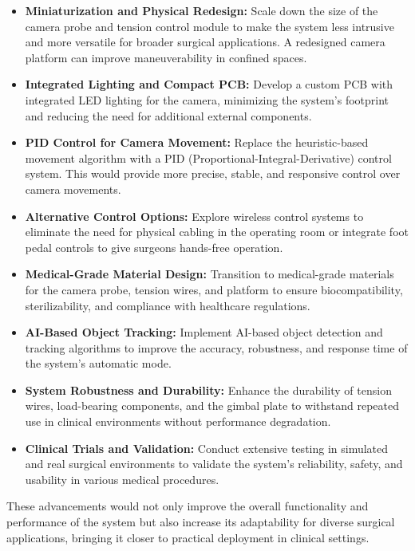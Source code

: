 \begin{itemize}
    \item \textbf{Miniaturization and Physical Redesign:} Scale down the size of the camera probe and tension control module to make the system less intrusive and more versatile for broader surgical applications. A redesigned camera platform can improve maneuverability in confined spaces.

    \item \textbf{Integrated Lighting and Compact PCB:} Develop a custom PCB with integrated LED lighting for the camera, minimizing the system's footprint and reducing the need for additional external components.

    \item \textbf{PID Control for Camera Movement:} Replace the heuristic-based movement algorithm with a PID (Proportional-Integral-Derivative) control system. This would provide more precise, stable, and responsive control over camera movements.

    \item \textbf{Alternative Control Options:} Explore wireless control systems to eliminate the need for physical cabling in the operating room or integrate foot pedal controls to give surgeons hands-free operation.

    \item \textbf{Medical-Grade Material Design:} Transition to medical-grade materials for the camera probe, tension wires, and platform to ensure biocompatibility, sterilizability, and compliance with healthcare regulations.

    \item \textbf{AI-Based Object Tracking:} Implement AI-based object detection and tracking algorithms to improve the accuracy, robustness, and response time of the system's automatic mode.

    \item \textbf{System Robustness and Durability:} Enhance the durability of tension wires, load-bearing components, and the gimbal plate to withstand repeated use in clinical environments without performance degradation.

    \item \textbf{Clinical Trials and Validation:} Conduct extensive testing in simulated and real surgical environments to validate the system's reliability, safety, and usability in various medical procedures.
\end{itemize}

These advancements would not only improve the overall functionality and performance of the system but also increase its adaptability for diverse surgical applications, bringing it closer to practical deployment in clinical settings.


